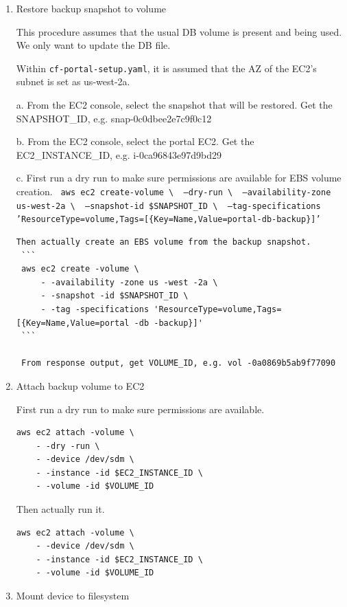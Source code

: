 \begin{enumerate}
\item Restore backup snapshot to volume

This procedure assumes that the usual DB volume is present and being used. We only want to update the DB file.

Within \texttt{cf-portal-setup.yaml}, it is assumed that the AZ of the EC2's subnet is set as us-west-2a.

a. From the EC2 console, select the snapshot that will be restored. Get the SNAPSHOT\_ID, e.g. snap-0c0dbee2e7c9f0c12

b. From the EC2 console, select the portal EC2. Get the EC2\_INSTANCE\_ID, e.g. i-0ca96843e97d9bd29

c. First run a dry run to make sure permissions are available for EBS volume creation.
\texttt{     aws ec2 create-volume {\textbackslash}~         --dry-run {\textbackslash}~         --availability-zone us-west-2a {\textbackslash}~         --snapshot-id \$SNAPSHOT\_ID {\textbackslash}~         --tag-specifications 'ResourceType=volume,Tags=[\{Key=Name,Value=portal-db-backup\}]'     }

\begin{verbatim}
Then actually create an EBS volume from the backup snapshot.
 ```
 aws ec2 create -volume \
     - -availability -zone us -west -2a \
     - -snapshot -id $SNAPSHOT_ID \
     - -tag -specifications 'ResourceType=volume,Tags=[{Key=Name,Value=portal -db -backup}]'
 ```

 From response output, get VOLUME_ID, e.g. vol -0a0869b5ab9f77090
\end{verbatim}


\item Attach backup volume to EC2

First run a dry run to make sure permissions are available.

\begin{verbatim}
aws ec2 attach -volume \
    - -dry -run \
    - -device /dev/sdm \
    - -instance -id $EC2_INSTANCE_ID \
    - -volume -id $VOLUME_ID
\end{verbatim}

Then actually run it.

\begin{verbatim}
aws ec2 attach -volume \
    - -device /dev/sdm \
    - -instance -id $EC2_INSTANCE_ID \
    - -volume -id $VOLUME_ID
\end{verbatim}


\item Mount device to filesystem


\end{enumerate}
